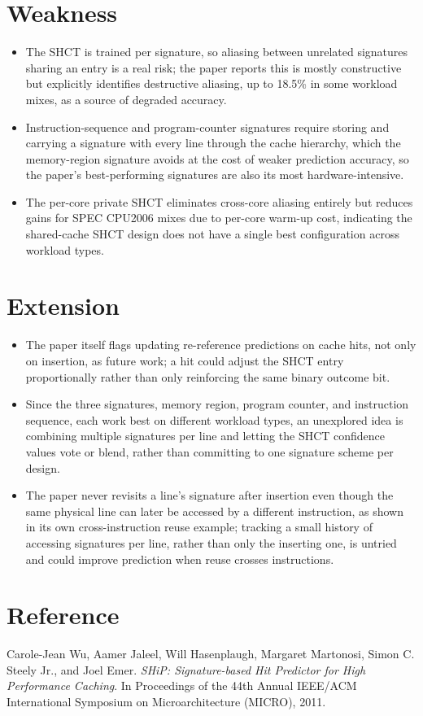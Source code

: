 \documentclass[10pt, conference]{IEEEtran}
\begin{document}
\section{Weakness}
\begin{itemize}[leftmargin=*, itemsep=0pt, topsep=1pt, parsep=0pt]
    \item The SHCT is trained per signature, so aliasing between unrelated signatures sharing an entry is a real risk; the paper reports this is mostly constructive but explicitly identifies destructive aliasing, up to 18.5\% in some workload mixes, as a source of degraded accuracy.
    \item Instruction-sequence and program-counter signatures require storing and carrying a signature with every line through the cache hierarchy, which the memory-region signature avoids at the cost of weaker prediction accuracy, so the paper's best-performing signatures are also its most hardware-intensive.
    \item The per-core private SHCT eliminates cross-core aliasing entirely but reduces gains for SPEC CPU2006 mixes due to per-core warm-up cost, indicating the shared-cache SHCT design does not have a single best configuration across workload types.
\end{itemize}

\section{Extension}
\begin{itemize}[leftmargin=*, itemsep=0pt, topsep=1pt, parsep=0pt]
    \item The paper itself flags updating re-reference predictions on cache hits, not only on insertion, as future work; a hit could adjust the SHCT entry proportionally rather than only reinforcing the same binary outcome bit.
    \item Since the three signatures, memory region, program counter, and instruction sequence, each work best on different workload types, an unexplored idea is combining multiple signatures per line and letting the SHCT confidence values vote or blend, rather than committing to one signature scheme per design.
    \item The paper never revisits a line's signature after insertion even though the same physical line can later be accessed by a different instruction, as shown in its own cross-instruction reuse example; tracking a small history of accessing signatures per line, rather than only the inserting one, is untried and could improve prediction when reuse crosses instructions.
\end{itemize}

\section{Reference}
Carole-Jean Wu, Aamer Jaleel, Will Hasenplaugh, Margaret Martonosi, Simon C. Steely Jr., and Joel Emer. \emph{SHiP: Signature-based Hit Predictor for High Performance Caching}. In Proceedings of the 44th Annual IEEE/ACM International Symposium on Microarchitecture (MICRO), 2011.
\end{document}
